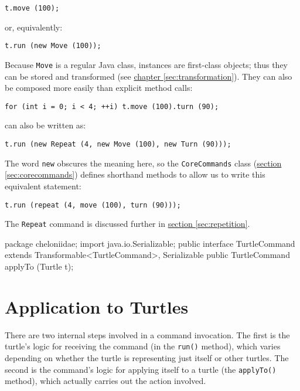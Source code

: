 \documentclass{report}
\newcommand{\Ref}[2]{\hyperref[#2]{#1 \ref*{#2}}}
\begin{document}
\begin{verbatim}
t.move (100);
\end{verbatim}

    \noindent or, equivalently:

\begin{verbatim}
t.run (new Move (100));
\end{verbatim}

    Because {\tt Move} is a regular Java class, instances are first-class objects; thus they can be stored and transformed (see
    \Ref{chapter}{sec:transformation}). They can also be composed more easily than explicit method calls:

\begin{verbatim}
for (int i = 0; i < 4; ++i) t.move (100).turn (90);
\end{verbatim}

    \noindent can also be written as:

\begin{verbatim}
t.run (new Repeat (4, new Move (100), new Turn (90)));
\end{verbatim}

    The word {\tt new} obscures the meaning here, so the {\tt CoreCommands} class (\Ref{section}{sec:corecommands}) defines shorthand methods to allow us to
    write this equivalent statement:

\begin{verbatim}
t.run (repeat (4, move (100), turn (90)));
\end{verbatim}

    The {\tt Repeat} command is discussed further in \Ref{section}{sec:repetition}.

\begin{javacode}
package cheloniidae;
import java.io.Serializable;
public interface TurtleCommand extends Transformable<TurtleCommand>, Serializable {
  public TurtleCommand applyTo (Turtle t);
}
\end{javacode}

\section {Application to Turtles} \label{sec:application-to-turtles}
      There are two internal steps involved in a command invocation. The first is the turtle's logic for receiving the command (in the {\tt run()} method),
      which varies depending on whether the turtle is representing just itself or other turtles. The second is the command's logic for applying itself to a
      turtle (the {\tt applyTo()} method), which actually carries out the action involved.
\end{document}
